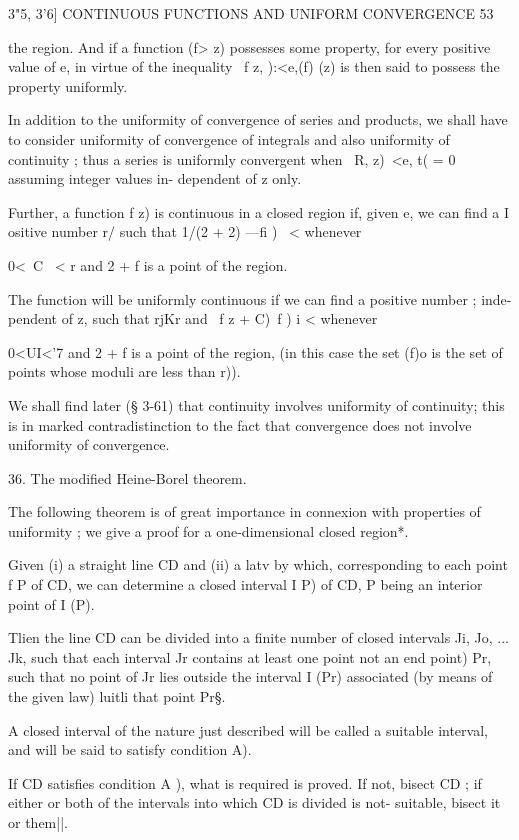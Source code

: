 3"5, 3'6] CONTINUOUS FUNCTIONS AND UNIFORM CONVERGENCE 53

the region. And if a function (f> z) possesses some property, for
every positive value of e, in virtue of the inequality \ f z, ):<e,(f)
(z) is then said to possess the property uniformly.

In addition to the uniformity of convergence of series and products,
we shall have to consider uniformity of convergence of integrals and
also uniformity of continuity ; thus a series is uniformly convergent
when \ R, z)\ <e, t( = 0 assuming integer values in- dependent of z
only.

Further, a function f z) is continuous in a closed region if, given e,
we can find a I ositive number r/ such that 1/(2 + 2) —fi ) \ <
whenever

0<\ C \ < r and 2 + f is a point of the region.

The function will be uniformly continuous if we can find a positive
number ; inde- pendent of z, such that rjKr and \ f z + C)~f ) i <
whenever

0<UI<'7 and 2 + f is a point of the region, (in this case the set (f)o
is the set of points whose moduli are less than r)).

We shall find later (§ 3-61) that continuity involves uniformity of
continuity; this is in marked contradistinction to the fact that
convergence does not involve uniformity of convergence.

36. The modified Heine-Borel theorem.

The following theorem is of great importance in connexion with
properties of uniformity ; we give a proof for a one-dimensional
closed region*.

Given (i) a straight line CD and (ii) a latv by which, corresponding
to each point f P of CD, we can determine a closed interval I P) of
CD, P being an interior point of I (P).

Tlien the line CD can be divided into a finite number of closed
intervals Ji, Jo, ... Jk, such that each interval Jr contains at least
one point not an end point) Pr, such that no point of Jr lies outside
the interval I (Pr) associated (by means of the given law) luitli that
point Pr§.

A closed interval of the nature just described will be called a
suitable interval, and will be said to satisfy condition A).

If CD satisfies condition A ), what is required is proved. If not,
bisect CD ; if either or both of the intervals into which CD is
divided is not- suitable, bisect it or them||.

